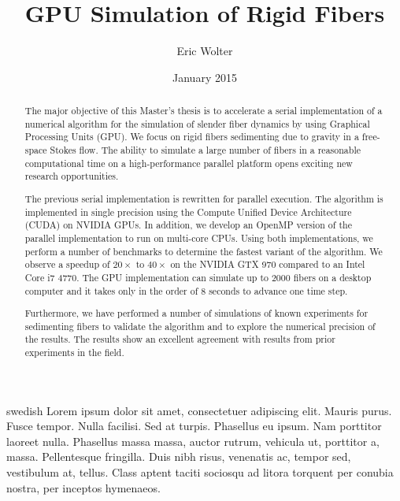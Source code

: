 \documentclass[a4paper,11pt]{kth-mag}
\title{GPU Simulation of Rigid Fibers}
\author{Eric Wolter}
\date{January 2015}
\begin{document}
\frontmatter
\pagestyle{empty}

\maketitle
{}
\begin{abstract}
The major objective of this Master's thesis is to accelerate a serial implementation of a numerical algorithm for the simulation of slender fiber dynamics by using Graphical Processing Units (GPU). We focus on rigid fibers sedimenting due to gravity in a free-space Stokes flow. The ability to simulate a large number of fibers in a reasonable computational time on a high-performance parallel platform opens exciting new research opportunities.

The previous serial implementation is rewritten for parallel execution. The algorithm is implemented in single precision using the Compute Unified Device Architecture (CUDA) on NVIDIA GPUs. In addition, we develop an OpenMP version of the parallel implementation to run on multi-core CPUs. Using both implementations, we perform a number of benchmarks to determine the fastest variant of the algorithm. We observe a speedup of $20×$ to $40×$ on the NVIDIA GTX 970 compared to an Intel Core i7 4770. The GPU implementation can simulate up to $2000$ fibers on a desktop computer and it takes only in the order of $8$ seconds to advance one time step.

Furthermore, we have performed a number of simulations of known experiments for sedimenting fibers to validate the algorithm and to explore the numerical precision of the results. The results show an excellent agreement with results from prior experiments in the field.
\end{abstract}

\clearpage


\begin{foreignabstract}{swedish}
Lorem ipsum dolor sit amet, consectetuer adipiscing elit. Mauris
purus. Fusce tempor. Nulla facilisi. Sed at turpis. Phasellus eu
ipsum. Nam porttitor laoreet nulla. Phasellus massa massa, auctor
rutrum, vehicula ut, porttitor a, massa. Pellentesque fringilla. Duis
nibh risus, venenatis ac, tempor sed, vestibulum at, tellus. Class
aptent taciti sociosqu ad litora torquent per conubia nostra, per
inceptos hymenaeos.
\end{foreignabstract}

\clearpage

\tableofcontents*
\end{document}
